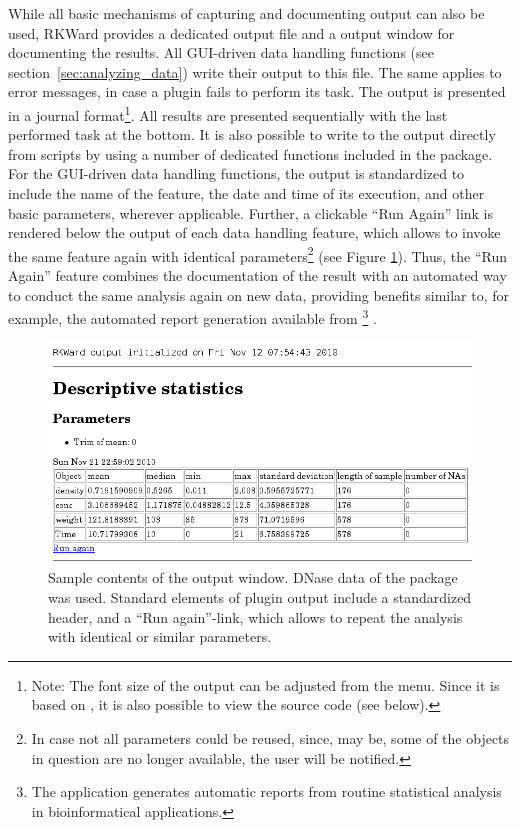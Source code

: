 While all basic mechanisms of
capturing and documenting  output can also
be used, RKWard provides a dedicated output file and a output
window for documenting the results. All GUI-driven data handling
functions (see section~\ref{sec:analyzing_data}) write their output to this file. 
The same applies to error messages, in case a plugin fails to perform its task.
The output is presented in a journal format\footnote{Note: The font size of the output can be adjusted
from the menu. 
Since it is based on , it is also possible to view the source code 
(see below).}. All results are presented
sequentially with the last performed task at the bottom.
It is also possible to write to the output directly from 
scripts by using a number of dedicated 
functions included in the  package. For the GUI-driven data handling functions, the output is
standardized to include the name of the feature, the date and time of
its execution, and other basic parameters, wherever
applicable. Further, a clickable ``Run
Again'' link is rendered below the output of each data
handling feature, which allows to invoke the same feature again with
identical parameters\footnote{In case not all parameters could be
reused, since, may be, some of the objects in
question are no longer available, the user will be notified.} (see
Figure \ref{fig:results_output}). Thus, the ``Run
Again'' feature combines the documentation of the result
with an automated way to conduct the same analysis again on new
data, providing benefits similar to, for example, the automated report generation
available from \footnote{The application generates automatic
reports from routine statistical analysis in bioinformatical
applications.} \citep{RaffelsbergerW2008}.

\begin{figure}[htp]
 \centering
 \includegraphics[width=15.5cm]{../figures/results_output_cropped.png}
 \caption{Sample contents of the output window. DNase data of the  package was used. 
  Standard elements of plugin output include  a standardized header, and a 
  ``Run again''-link, which allows to repeat the analysis with identical or 
  similar parameters.}
 \label{fig:results_output}
\end{figure}

